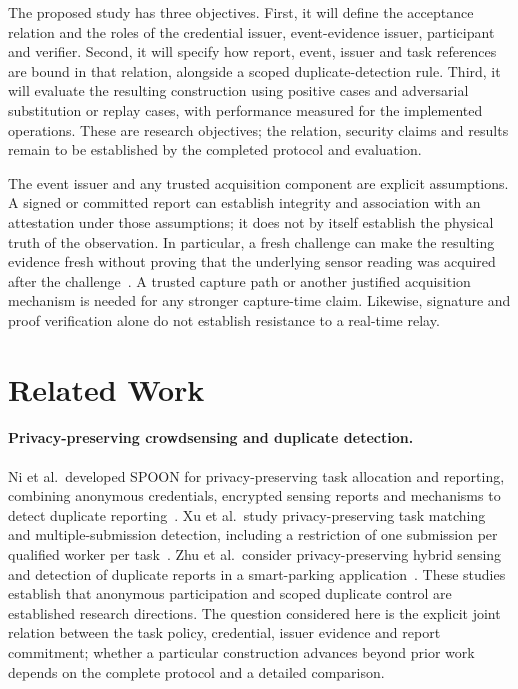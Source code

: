 The proposed study has three objectives. First, it will define the acceptance relation and the roles of the credential issuer, event-evidence issuer, participant and verifier. Second, it will specify how report, event, issuer and task references are bound in that relation, alongside a scoped duplicate-detection rule. Third, it will evaluate the resulting construction using positive cases and adversarial substitution or replay cases, with performance measured for the implemented operations. These are research objectives; the relation, security claims and results remain to be established by the completed protocol and evaluation.

The event issuer and any trusted acquisition component are explicit assumptions. A signed or committed report can establish integrity and association with an attestation under those assumptions; it does not by itself establish the physical truth of the observation. In particular, a fresh challenge can make the resulting evidence fresh without proving that the underlying sensor reading was acquired after the challenge~\cite{Birkholz2023RATS}. A trusted capture path or another justified acquisition mechanism is needed for any stronger capture-time claim. Likewise, signature and proof verification alone do not establish resistance to a real-time relay.

\section{Related Work}

\paragraph{Privacy-preserving crowdsensing and duplicate detection.}
Ni et al.\ developed SPOON for privacy-preserving task allocation and reporting, combining anonymous credentials, encrypted sensing reports and mechanisms to detect duplicate reporting~\cite{Ni2020SPOON}. Xu et al.\ study privacy-preserving task matching and multiple-submission detection, including a restriction of one submission per qualified worker per task~\cite{Xu2021TaskMatching}. Zhu et al.\ consider privacy-preserving hybrid sensing and detection of duplicate reports in a smart-parking application~\cite{Zhu2022HybridSensing}. These studies establish that anonymous participation and scoped duplicate control are established research directions. The question considered here is the explicit joint relation between the task policy, credential, issuer evidence and report commitment; whether a particular construction advances beyond prior work depends on the complete protocol and a detailed comparison.

